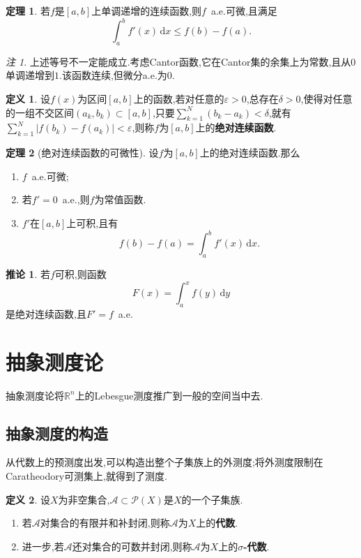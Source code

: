 \documentclass{ctexart}
\theoremstyle{definition}
\newtheorem{definition}{定义}
\newtheorem{theorem}{定理}
\newtheorem{corollary}{推论}
\theoremstyle{remark}
\newtheorem*{remark}{注}
\begin{document}
	\begin{theorem}
		若$f$是$[a,b]$上单调递增的连续函数,则$f$\ a.e.可微,且满足
		$$\int_a^b{f'(x)\,\mathrm{d}x}\le f(b)-f(a).$$
	\end{theorem}
	\begin{remark}
		上述等号不一定能成立.考虑Cantor函数,它在Cantor集的余集上为常数,且从$0$单调递增到$1$.该函数连续,但微分a.e.为$0$.
	\end{remark}
	
	\begin{definition}
		设$f(x)$为区间$[a,b]$上的函数,若对任意的$\varepsilon>0$,总存在$\delta>0$,使得对任意的一组不交区间$(a_k,b_k)\subset[a,b]$,只要$\sum_{k=1}^N{(b_k-a_k)}<\delta$,就有$\sum_{k=1}^N{|f(b_k)-f(a_k)|}<\varepsilon$,则称$f$为$[a,b]$上的\textbf{绝对连续函数}.
	\end{definition}
	\begin{theorem}[绝对连续函数的可微性]
		设$f$为$[a,b]$上的绝对连续函数.那么
		\begin{enumerate}
			\item $f$\ a.e.可微;
			\item 若$f'=0$\ a.e.,则$f$为常值函数.
			\item $f'$在$[a,b]$上可积,且有
			$$f(b)-f(a)=\int_a^b{f'(x)\,\mathrm{d}x}.$$
		\end{enumerate}
	\end{theorem}
	\begin{corollary}
		若$f$可积,则函数
		$$F(x)=\int_a^x{f(y)\,\mathrm{d}y}$$
		是绝对连续函数,且$F'=f$\ a.e.
	\end{corollary}
	
	\section{抽象测度论}
	抽象测度论将$\mathbb{R}^n$上的Lebesgue测度推广到一般的空间当中去.
	
	\subsection{抽象测度的构造}
	从代数上的预测度出发,可以构造出整个子集族上的外测度;将外测度限制在Caratheodory可测集上,就得到了测度.
	
	\begin{definition}
		设$X$为非空集合,$\mathcal{A}\subset\mathcal{P}(X)$是$X$的一个子集族.
		\begin{enumerate}
			\item 若$\mathcal{A}$对集合的有限并和补封闭,则称$\mathcal{A}$为$X$上的\textbf{代数}.
			\item 进一步,若$\mathcal{A}$还对集合的可数并封闭,则称$\mathcal{A}$为$X$上的\textbf{$\sigma$-代数}.
		\end{enumerate}
	\end{definition}
	
\end{document}
